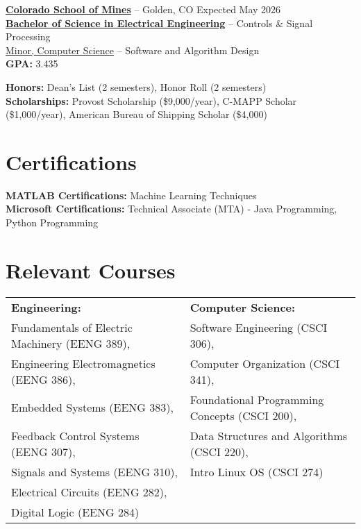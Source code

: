 \documentclass[11pt]{article}       %
\begin{document}
\textbf{\href{https://www.mines.edu/}{Colorado School of Mines}} -- Golden, CO \hfill Expected May 2026 \\
\textbf{\href{https://electrical.mines.edu/undergraduate-program/}{Bachelor of Science in Electrical Engineering}} -- Controls \& Signal Processing \\
\href{https://cs.mines.edu/csmines-minors-and-areas-of-special-interest/}{Minor, Computer Science} -- Software and Algorithm Design \\
\textbf{GPA:} 3.435

\textbf{Honors:} Dean's List (2 semesters), Honor Roll (2 semesters) \\
\textbf{Scholarships:} Provost Scholarship (\$9,000/year), C-MAPP Scholar (\$1,000/year), American Bureau of Shipping Scholar (\$4,000)

\vspace{-8pt}
\section*{Certifications}
\vspace{3pt}

\textbf{MATLAB Certifications:} Machine Learning Techniques \\
\textbf{Microsoft Certifications:} Technical Associate (MTA) - Java Programming, Python Programming

\vspace{-8pt}
\section*{Relevant Courses}
\vspace{3pt}
\noindent
\begin{tabular}{@{}p{}@{\hspace{1em}}p{}@{}}
\textbf{Engineering:} & \textbf{Computer Science:} \\
Fundamentals of Electric Machinery (EENG 389),      & Software Engineering (CSCI 306), \\
Engineering Electromagnetics (EENG 386),             & Computer Organization (CSCI 341), \\
Embedded Systems (EENG 383),                         & Foundational Programming Concepts (CSCI 200), \\
Feedback Control Systems (EENG 307),                 & Data Structures and Algorithms (CSCI 220), \\
Signals and Systems (EENG 310),                      & Intro Linux OS (CSCI 274) \\
Electrical Circuits (EENG 282),                      &  \\
Digital Logic (EENG 284)                             & 
\end{tabular}
\end{document}
